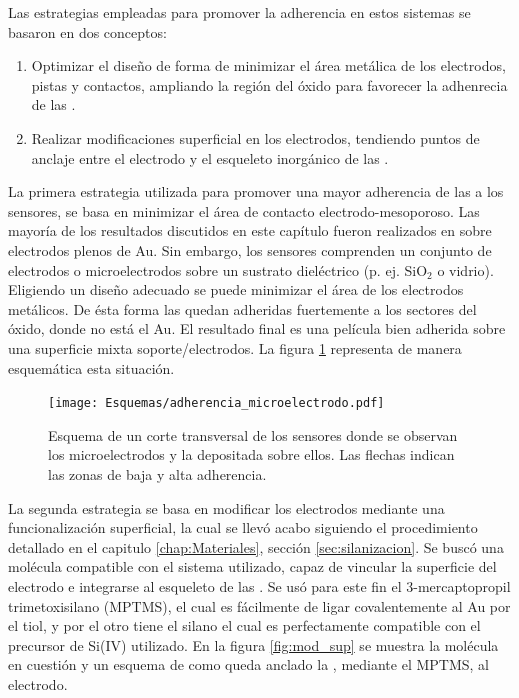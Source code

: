              Las estrategias empleadas para promover la adherencia en estos sistemas se basaron en dos conceptos:
				\begin{enumerate}

					\item Optimizar el diseño de forma de minimizar el área metálica de los electrodos, pistas y contactos, ampliando la región del óxido para favorecer la adhenrecia de las \pdm.

					\item Realizar modificaciones superficial en los electrodos, tendiendo puntos de anclaje entre el electrodo y el esqueleto inorgánico de las \pdm.

					\end{enumerate}
			
			 La primera estrategia utilizada para promover una mayor adherencia de las \pdm\space a los sensores, se basa en minimizar el área de contacto electrodo-mesoporoso. Las mayoría de los resultados discutidos en este capítulo fueron realizados en \pdm\space sobre electrodos plenos de Au. Sin embargo, los sensores comprenden un conjunto de electrodos o microelectrodos sobre un sustrato dieléctrico (p. ej. SiO$_2$ o vidrio). Eligiendo un diseño adecuado se puede minimizar el área de los electrodos metálicos. De ésta forma las \pdm\space quedan adheridas fuertemente a los sectores del óxido, donde no está el Au. El resultado final es una película bien adherida sobre una superficie mixta soporte/electrodos.  La figura \ref{fig:adherencia_microelectrodo} representa de manera esquemática esta situación.
			
				\begin{figure}[!ht]
					\begin{center}
					\texttt{[image: Esquemas/adherencia\_microelectrodo.pdf]}
					\caption[Adherencia a los microelectrodos.]{Esquema de un corte transversal de los sensores donde se observan los microelectrodos y la \pdm\space depositada sobre ellos. Las flechas indican las zonas de baja y alta adherencia.}
					\label{fig:adherencia_microelectrodo}
					\end{center}
					\end{figure}
					
					
			 La segunda estrategia se basa en modificar los electrodos mediante una funcionalización superficial, la cual se llevó acabo siguiendo el procedimiento detallado en el capitulo \ref{chap:Materiales}, sección \ref{sec:silanizacion}. Se buscó una molécula compatible con el sistema utilizado, capaz de vincular la superficie del electrodo e integrarse al esqueleto de las \pdm. Se usó para este fin el 3-mercaptopropil trimetoxisilano (MPTMS), el cual es fácilmente de ligar covalentemente al Au por el tiol\cite{Gosser,Byun2013}, y por el otro tiene el silano el cual es perfectamente compatible con el precursor de Si(IV) utilizado\cite{Wu2014,Wu2013,Chen2011}. En la figura \ref{fig:mod_sup} se muestra la molécula en cuestión y un esquema de como queda anclado la \pdm, mediante el MPTMS, al electrodo.
		
